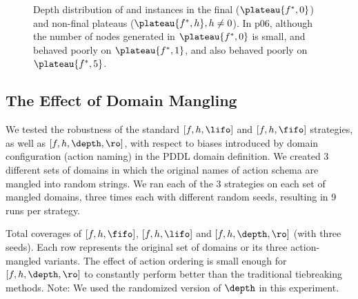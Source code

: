 \begin{figure}[htbp]
 \caption{Depth distribution of  and  instances in the final ($\plateau{f^*,0}$) and non-final plateaus ($\plateau{f^*,h}, h\not=0$). In  p06, although the number of nodes generated in $\plateau{f^*,0}$ is small, \fifo and \ro behaved poorly on $\plateau{f^*,1}$, and also \lifo behaved poorly on $\plateau{f^*,5}$.
 }
 \label{fig:depth-histogram4}
\end{figure}




\subsection{The Effect of Domain Mangling}

\label{sec:mangling}


We tested the robustness of the standard $[f,h,\lifo]$ and $[f,h,\fifo]$ strategies, as well as $[f,h,\depth,\ro]$,
with respect to 
biases introduced by domain configuration (action naming) in the PDDL domain definition.
We created 3 different sets of domains in which the
original names of action schema are mangled into random strings. 
We ran each of the 3 strategies on each
set of mangled domains, three times each with different random seeds,
resulting in 9 runs per strategy.

\begin{table}[tb]
 \centering {}
 
 \caption{Total coverages of $[f,h,\fifo]$, $[f,h,\lifo]$
 and $[f,h,\depth,\ro]$ (with three seeds). Each row represents the original set of
 domains or its three action-mangled variants. The effect
 of action ordering is small enough for $[f,h,\depth,\ro]$ to
 constantly perform better than the traditional tiebreaking methods.
Note: We used the randomized version of $\depth$ in this experiment.
}
 \label{actionordering-robustness}
\end{table}

